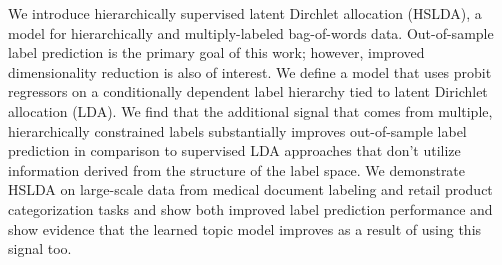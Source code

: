 We introduce hierarchically supervised latent Dirchlet allocation (HSLDA), a model for hierarchically and multiply-labeled bag-of-words data.  Out-of-sample label prediction is the primary goal of this work; however, improved dimensionality reduction is also of interest.  We define a model that uses probit regressors on a conditionally dependent label hierarchy tied to latent Dirichlet allocation (LDA).  We find that the additional signal that comes from multiple, hierarchically constrained labels substantially improves out-of-sample label prediction in comparison to supervised LDA approaches that don't utilize information derived from the structure of the label space.   We demonstrate HSLDA on large-scale data from medical document labeling and retail product categorization tasks and show both improved label prediction performance and show evidence that the learned topic model improves as a result of using this signal too.  



